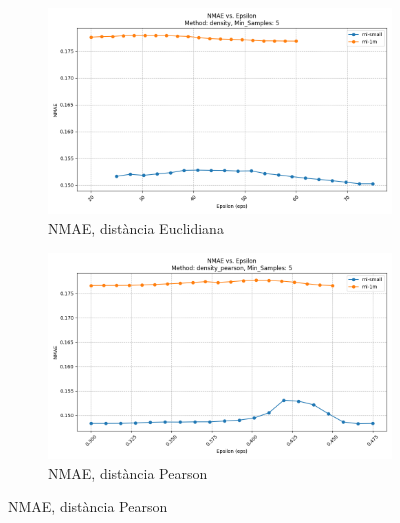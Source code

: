 \documentclass[a4paper,12pt]{report}
\begin{document}
\begin{figure}[H]
    \centering
    \begin{subfigure}[b]{0.49\textwidth}
        \includegraphics[width=\textwidth]{Figuras/DBSCAN/res/ml-small_ml-1m_density_nmae_vs_eps.png}
        \caption{NMAE, distància Euclidiana}
        \label{fig:dbscan-clustering-results-a}
    \end{subfigure}
    \hfill
    \begin{subfigure}[b]{0.49\textwidth}
        \includegraphics[width=\textwidth]{Figuras/DBSCAN/res/ml-small_ml-1m_density_pearson_nmae_vs_eps.png}
        \caption{NMAE, distància Pearson}
        \label{fig:dbscan-clustering-results-b}
    \end{subfigure}

    \vspace{1em}


\end{figure}
\end{document}
